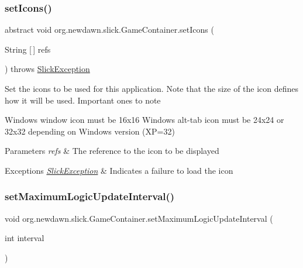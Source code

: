 \subsubsection{\texorpdfstring{set\+Icons()}{setIcons()}}
{\footnotesize\ttfamily abstract void org.\+newdawn.\+slick.\+Game\+Container.\+set\+Icons (\begin{DoxyParamCaption}\item[{String \mbox{[}$\,$\mbox{]}}]{refs }\end{DoxyParamCaption}) throws \mbox{\hyperlink{classorg_1_1newdawn_1_1slick_1_1_slick_exception}{Slick\+Exception}}\hspace{0.3cm}{\ttfamily [abstract]}}

Set the icons to be used for this application. Note that the size of the icon defines how it will be used. Important ones to note

Windows window icon must be 16x16 Windows alt-\/tab icon must be 24x24 or 32x32 depending on Windows version (XP=32)


\begin{DoxyParams}{Parameters}
{\em refs} & The reference to the icon to be displayed \\
\hline
\end{DoxyParams}

\begin{DoxyExceptions}{Exceptions}
{\em \mbox{\hyperlink{classorg_1_1newdawn_1_1slick_1_1_slick_exception}{Slick\+Exception}}} & Indicates a failure to load the icon \\
\hline
\end{DoxyExceptions}
\mbox{\label{classorg_1_1newdawn_1_1slick_1_1_game_container_a256a6239d95ad2bc266cfc8be0750099}} 
\subsubsection{\texorpdfstring{set\+Maximum\+Logic\+Update\+Interval()}{setMaximumLogicUpdateInterval()}}
{\footnotesize\ttfamily void org.\+newdawn.\+slick.\+Game\+Container.\+set\+Maximum\+Logic\+Update\+Interval (\begin{DoxyParamCaption}\item[{int}]{interval }\end{DoxyParamCaption})\hspace{0.3cm}{\ttfamily [inline]}}

